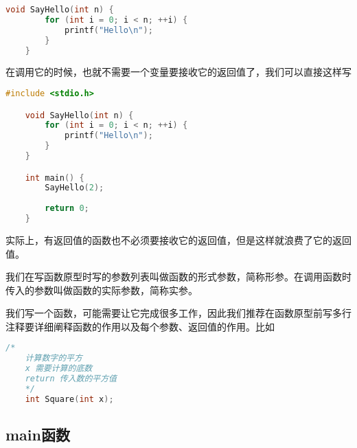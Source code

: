 \begin{lstlisting}[language=C]
    void SayHello(int n) {
        for (int i = 0; i < n; ++i) {
            printf("Hello\n");
        }
    }
\end{lstlisting}

在调用它的时候，也就不需要一个变量要接收它的返回值了，我们可以直接这样写

\begin{lstlisting}[language=C]
    #include <stdio.h>

    void SayHello(int n) {
        for (int i = 0; i < n; ++i) {
            printf("Hello\n");
        }
    }

    int main() {
        SayHello(2);
        
        return 0;
    }
\end{lstlisting}

实际上，有返回值的函数也不必须要接收它的返回值，但是这样就浪费了它的返回值。

我们在写函数原型时写的参数列表叫做函数的形式参数，简称形参。在调用函数时传入的参数叫做函数的实际参数，简称实参。

我们写一个函数，可能需要让它完成很多工作，因此我们推荐在函数原型前写多行注释要详细阐释函数的作用以及每个参数、返回值的作用。比如

\begin{lstlisting}[language=C]
    /*
    计算数字的平方
    x 需要计算的底数
    return 传入数的平方值
    */
    int Square(int x);
\end{lstlisting}

\subsection{main函数}
